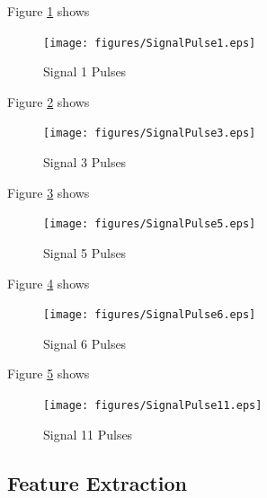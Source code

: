 \documentclass{article}
\begin{document}
Figure \ref{fig:SignalPulse1} shows 
\begin{figure}[H]
    \centering
    \texttt{[image: figures/SignalPulse1.eps]}
    \caption{Signal 1 Pulses}
    \label{fig:SignalPulse1}
\end{figure}


Figure \ref{fig:SignalPulse3} shows 
\begin{figure}[H]
    \centering
    \texttt{[image: figures/SignalPulse3.eps]}
    \caption{Signal 3 Pulses}
    \label{fig:SignalPulse3}
\end{figure}


Figure \ref{fig:SignalPulse5} shows 
\begin{figure}[H]
    \centering
    \texttt{[image: figures/SignalPulse5.eps]}
    \caption{Signal 5 Pulses}
    \label{fig:SignalPulse5}
\end{figure}


Figure \ref{fig:SignalPulse6} shows 
\begin{figure}[H]
    \centering
    \texttt{[image: figures/SignalPulse6.eps]}
    \caption{Signal 6 Pulses}
    \label{fig:SignalPulse6}
\end{figure}


Figure \ref{fig:SignalPulse11} shows 
\begin{figure}[H]
    \centering
    \texttt{[image: figures/SignalPulse11.eps]}
    \caption{Signal 11 Pulses}
    \label{fig:SignalPulse11}
\end{figure}

\subsection{Feature Extraction}
\end{document}
